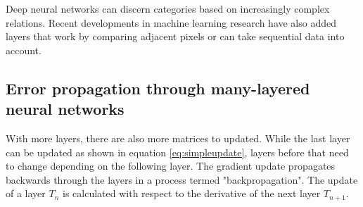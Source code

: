 \documentclass[a4paper, justified]{tufte-handout}
\begin{document}
Deep neural networks can discern categories based on increasingly complex relations. Recent developments in machine learning research have also added layers that work by comparing adjacent pixels or can take sequential data into account. 
 

\subsection{Error propagation through many-layered neural networks}

With more layers, there are also more matrices to updated. While the last layer can be updated as shown in equation \eqref{eq:simpleupdate}, layers before that need to change depending on the following layer. The gradient update propagates backwards through the layers in a process termed "backpropagation". The update of a layer $T_n$ is calculated with respect to the derivative of the next layer $T_{n+1}$.
%
%
%
\end{document}
